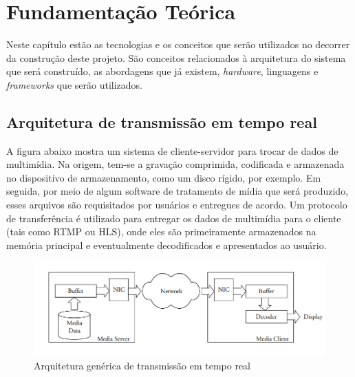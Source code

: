 \documentclass[12pt, %
openright, 
oneside, %
a4paper,    %
brazil]{facom-ufu-abntex2}
\begin{document}




\chapter{Fundamentação Teórica}

Neste capítulo estão as tecnologias e os conceitos que serão utilizados no
decorrer da construção deste projeto. São conceitos relacionados à arquitetura
do sistema que será construído, as abordagens que já existem, \emph{hardware},
linguagens e \emph{frameworks} que serão utilizados.

\section{Arquitetura de transmissão em tempo real}

A figura abaixo mostra um sistema de cliente-servidor para trocar de dados de
multimídia. Na origem, tem-se a gravação comprimida, codificada e armazenada no
dispositivo de armazenamento, como um disco rígido, por exemplo. Em seguida,
por meio de algum software de tratamento de mídia que será produzido, esses
arquivos são requisitados por usuários e entregues de acordo. Um protocolo de
transferência é utilizado para entregar os dados de multimídia para o cliente
(tais como RTMP ou HLS), onde eles são primeiramente armazenados na memória
principal e eventualmente decodificados e apresentados ao usuário.
\cite{lee2005scalable}

\begin{figure}[!ht]
	\centering
	\includegraphics[width=1\linewidth]{Capturar.PNG}
	\caption[Representação de um arquitetura de tempo real genérica]{Arquitetura genérica de transmissão em tempo real}
	\label{fig:graficosVariandoTamanhoRede}
\end{figure}
\end{document}
